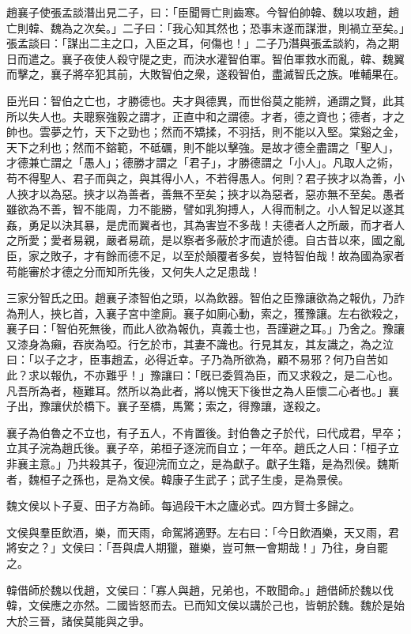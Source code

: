 趙襄子使張孟談潛出見二子，曰：「臣聞脣亡則齒寒。今智伯帥韓、魏以攻趙，趙亡則韓、魏為之次矣。」二子曰：「我心知其然也；恐事末遂而謀泄，則禍立至矣。」張孟談曰：「謀出二主之口，入臣之耳，何傷也！」二子乃潛與張孟談約，為之期日而遣之。襄子夜使人殺守隄之吏，而決水灌智伯軍。智伯軍救水而亂，韓、魏翼而擊之，襄子將卒犯其前，大敗智伯之衆，遂殺智伯，盡滅智氏之族。唯輔果在。

    臣光曰：智伯之亡也，才勝德也。夫才與德異，而世俗莫之能辨，通謂之賢，此其所以失人也。夫聰察強毅之謂才，正直中和之謂德。才者，德之資也；德者，才之帥也。雲夢之竹，天下之勁也；然而不矯揉，不羽括，則不能以入堅。棠谿之金，天下之利也；然而不鎔範，不砥礪，則不能以擊強。是故才德全盡謂之「聖人」，才德兼亡謂之「愚人」；德勝才謂之「君子」，才勝德謂之「小人」。凡取人之術，苟不得聖人、君子而與之，與其得小人，不若得愚人。何則？君子挾才以為善，小人挾才以為惡。挾才以為善者，善無不至矣；挾才以為惡者，惡亦無不至矣。愚者雖欲為不善，智不能周，力不能勝，譬如乳狗搏人，人得而制之。小人智足以遂其姦，勇足以決其暴，是虎而翼者也，其為害豈不多哉！夫德者人之所嚴，而才者人之所愛；愛者易親，嚴者易疏，是以察者多蔽於才而遺於德。自古昔以來，國之亂臣，家之敗子，才有餘而德不足，以至於顛覆者多矣，豈特智伯哉！故為國為家者苟能審於才德之分而知所先後，又何失人之足患哉！

三家分智氏之田。趙襄子漆智伯之頭，以為飲器。智伯之臣豫讓欲為之報仇，乃詐為刑人，挾匕首，入襄子宮中塗廁。襄子如廁心動，索之，獲豫讓。左右欲殺之，襄子曰：「智伯死無後，而此人欲為報仇，真義士也，吾謹避之耳。」乃舍之。豫讓又漆身為癩，吞炭為啞。行乞於市，其妻不識也。行見其友，其友識之，為之泣曰：「以子之才，臣事趙孟，必得近幸。子乃為所欲為，顧不易邪？何乃自苦如此？求以報仇，不亦難乎！」豫讓曰：「旣已委質為臣，而又求殺之，是二心也。凡吾所為者，極難耳。然所以為此者，將以愧天下後世之為人臣懷二心者也。」襄子出，豫讓伏於橋下。襄子至橋，馬驚；索之，得豫讓，遂殺之。

襄子為伯魯之不立也，有子五人，不肯置後。封伯魯之子於代，曰代成君，早卒；立其子浣為趙氏後。襄子卒，弟桓子逐浣而自立；一年卒。趙氏之人曰：「桓子立非襄主意。」乃共殺其子，復迎浣而立之，是為獻子。獻子生籍，是為烈侯。魏斯者，魏桓子之孫也，是為文侯。韓康子生武子；武子生虔，是為景侯。

魏文侯以卜子夏、田子方為師。每過段干木之廬必式。四方賢士多歸之。

文侯與羣臣飲酒，樂，而天雨，命駕將適野。左右曰：「今日飲酒樂，天又雨，君將安之？」文侯曰：「吾與虞人期獵，雖樂，豈可無一會期哉！」乃往，身自罷之。

韓借師於魏以伐趙，文侯曰：「寡人與趙，兄弟也，不敢聞命。」趙借師於魏以伐韓，文侯應之亦然。二國皆怒而去。已而知文侯以講於己也，皆朝於魏。魏於是始大於三晉，諸侯莫能與之爭。 


